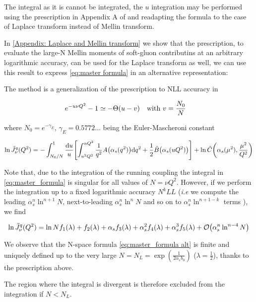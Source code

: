 \documentclass[../main.tex]{subfiles}
\begin{document}
The integral as it is cannot be integrated, the $u$ integration may be performed using the prescription in Appendix A of \cite{Catani_2003_appendix} and
readapting the formula to the case of Laplace transform instead of Mellin transform.

In \cref{Appendix: Laplace and Mellin transform} we show that the prescription, to evaluate the large-N Mellin moments of soft-gluon
contributins at an arbitrary logarithmic accuracy, can be used for the Laplace transform as well, we can use this result to express \cref{eq:master formula} 
in an alternative representation:

The method is a generalization of the prescription to NLL accuracy in \cite{CATANI19933}

\begin{equation}
    e^{-u \nu Q^2} - 1 \simeq -\Theta(u-v) \qq{with $v = \frac{N_0}{N}$}
\end{equation}

where $N_0 = e^{-\gamma_E}$, $\gamma_E = 0.5772 \dots $ being the Euler-Mascheroni constant

\begin{equation}\label{eq:master_formula alt}
    \ln \tilde{J}_\nu^q(Q^2) = - \int_{N_0/N}^{1} \frac{\dd u}{u} \qty[ \int_{u^2 Q^2}^{u Q^2} \frac{1}{q^2} A\qty(\alpha_s(q^2)) \dd q^2 + \frac{1}{2} \tilde{B}\qty(\alpha_s(u Q^2))] + \ln \tilde{C}\qty(\alpha_s(\mu^2),\frac{\mu^2}{Q^2})
\end{equation}

Note that, due to the integration of the running coupling the integral in \cref{eq:master_formula} is singular for all values of $N=\nu Q^2$. However, if we perform the integration up 
to a fixed logarithmic accuracy $N^kLL$ (\emph{i.e} we compute the leading $\alpha_s^n \ln^{n+1}N$, next-to-leading $\alpha_s^n \ln^nN$ and so on to $\alpha_s^n \ln^{n+1-k}$ terms ), we find 

\begin{equation}
    \ln \tilde{J}_\nu^q(Q^2) = \ln N f_1(\lambda) + f_2(\lambda) + \alpha_s f_3(\lambda) + \alpha_s^2 f_4(\lambda) + \alpha_s^3 f_5(\lambda) + \order{\alpha_s^n \ln^{n-4}N}
\end{equation}

We observe that the N-space formula \cref{eq:master_formula alt} is finite and uniquely defined up to the 
very large $N=N_L=\exp(\frac{1}{2\alpha_s b_0})$ ($\lambda = \frac{1}{2}$), thanks to the prescription above.

The region where the integral is divergent is therefore excluded from the integration if $N < N_L$.
\end{document}
